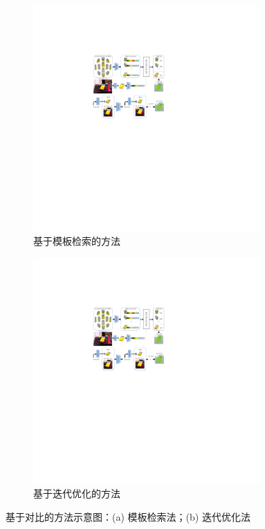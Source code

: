 \begin{figure}[htbp]
    \centering
    \begin{subfigure}[b]{0.95\textwidth}
        \centering
        \includegraphics[width=0.95\textwidth]{figure/intro/模板检索.pdf}
        \caption{基于模板检索的方法}
        \label{fig:基于模板检索的方法}
    \end{subfigure}
    \vfill
    \begin{subfigure}[b]{0.95\textwidth}
        \centering
        \includegraphics[width=0.95\textwidth]{figure/intro/迭代优化.pdf}
        \caption{基于迭代优化的方法}
        \label{fig:基于迭代优化的方法}
    \end{subfigure}
    \caption{基于对比的方法示意图：(a) 模板检索法；(b) 迭代优化法}
    \label{fig:基于对比的方法}
\end{figure}

